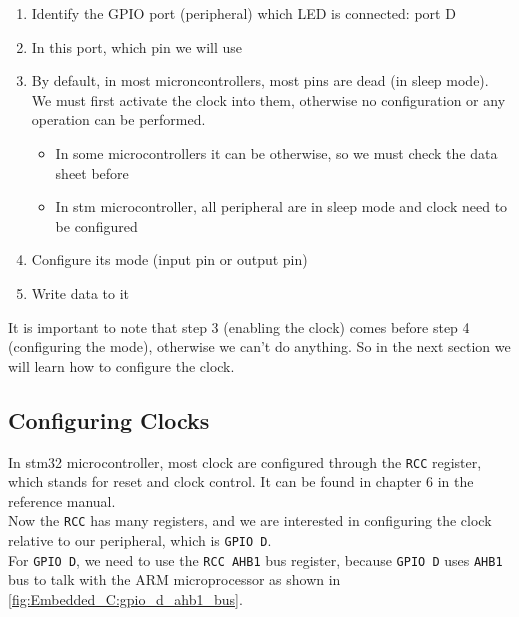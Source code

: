 \begin{enumerate}
    \item Identify the GPIO port (peripheral) which LED is connected: port D
    
    \item In this port, which pin we will use  
    
    \item {}
    
    By default, in most microncontrollers, most pins are dead (in sleep mode). We must first activate the clock into them, otherwise no configuration or any operation can be performed.
    
    \begin{itemize}
        \item In some microcontrollers it can be otherwise, so we must check the data sheet before
        
        \item In stm microcontroller, all peripheral are in sleep mode and clock need to be configured
    \end{itemize}
    
    
\item Configure its mode (input pin or output pin)  

\item Write data to it
    
\end{enumerate}

It  is important to note that step 3 (enabling the clock) comes before step 4 (configuring the mode), otherwise we can't do anything. So in the next section we will learn how to configure the clock.

\newpage
\subsection{Configuring Clocks}

In stm32 microcontroller, most clock are configured through the \verb|RCC| register, which stands for reset and clock control. It can be found in chapter 6 in the reference manual.\\

Now the \verb|RCC| has many registers, and we are interested in configuring the clock relative to our peripheral, which is \verb|GPIO D|.\\

For \verb|GPIO D|, we need to use the \verb|RCC AHB1| bus register, because \verb|GPIO D| uses \verb|AHB1| bus to talk with the ARM microprocessor as shown in \autoref{fig:Embedded_C:gpio_d_ahb1_bus}.


